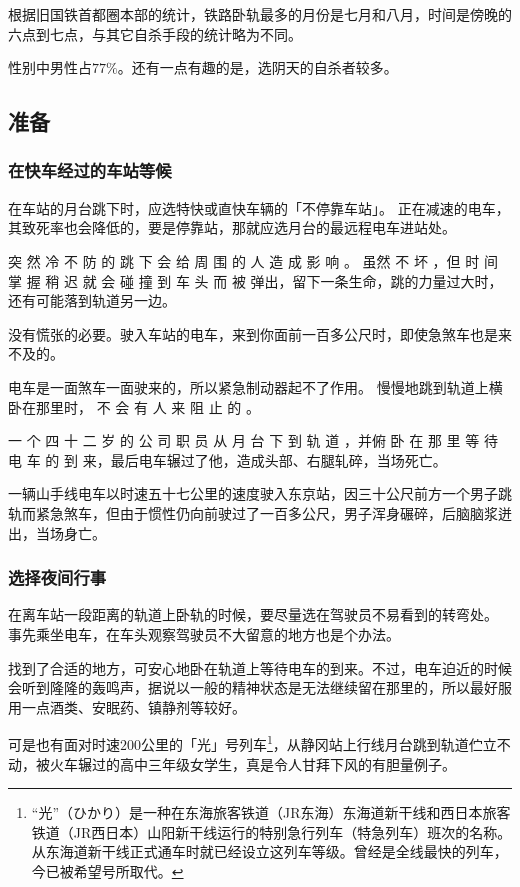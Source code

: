 \documentclass[UTF8]{ctexart}
\begin{document}
根据旧国铁首都圈本部的统计，铁路卧轨最多的月份是七月和八月，时间是傍晚的六点到七点，与其它自杀手段的统计略为不同。

性别中男性占$77\%$。还有一点有趣的是，选阴天的自杀者较多。

\subsection{准备}

\subsubsection*{在快车经过的车站等候}

在车站的月台跳下时，应选特快或直快车辆的「不停靠车站」。
正在减速的电车，其致死率也会降低的，要是停靠站，那就应选月台的最远程电车进站处。

突 然 冷 不 防 的 跳 下 会 给 周 围 的 人 造 成 影 响 。
虽然 不 坏 ，但 时 间 掌 握 稍 迟 就 会 碰 撞 到 车 头 而 被 弹出，留下一条生命，跳的力量过大时，还有可能落到轨道另一边。

没有慌张的必要。驶入车站的电车，来到你面前一百多公尺时，即使急煞车也是来不及的。 

电车是一面煞车一面驶来的，所以紧急制动器起不了作用。
慢慢地跳到轨道上横卧在那里时， 不 会 有 人 来 阻 止 的 。

一 个 四 十 二 岁 的 公 司 职 员 从 月 台 下 到 轨 道 ，并俯 卧 在 那 里 等 待 电 车 的 到 来，最后电车辗过了他，造成头部、右腿轧碎，当场死亡。 

一辆山手线电车以时速五十七公里的速度驶入东京站，因三十公尺前方一个男子跳轨而紧急煞车，但由于惯性仍向前驶过了一百多公尺，男子浑身碾碎，后脑脑浆迸出，当场身亡。

\subsubsection*{选择夜间行事}

在离车站一段距离的轨道上卧轨的时候，要尽量选在驾驶员不易看到的转弯处。
事先乘坐电车，在车头观察驾驶员不大留意的地方也是个办法。

找到了合适的地方，可安心地卧在轨道上等待电车的到来。不过，电车迫近的时候会听到隆隆的轰鸣声，据说以一般的精神状态是无法继续留在那里的，所以最好服用一点酒类、安眠药、镇静剂等较好。

可是也有面对时速$200$公里的「光」号列车\footnote{“光”（ひかり）是一种在东海旅客铁道（JR东海）东海道新干线和西日本旅客铁道（JR西日本）山阳新干线运行的特别急行列车（特急列车）班次的名称。从东海道新干线正式通车时就已经设立这列车等级。曾经是全线最快的列车，今已被希望号所取代。}，从静冈站上行线月台跳到轨道伫立不动，被火车辗过的高中三年级女学生，真是令人甘拜下风的有胆量例子。
\end{document}
